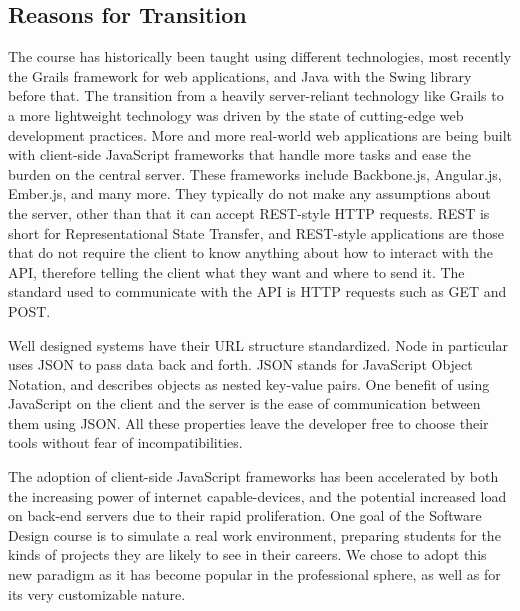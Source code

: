 \documentclass[12pt]{article}
\begin{document}
\subsection{Reasons for Transition}\label{sec:reasons_for_transition}
The course has historically been taught using different technologies, most recently the Grails framework for web applications, and Java with the Swing library before that. 
The transition from a heavily server-reliant technology like Grails to a more lightweight technology was driven by the state of cutting-edge web development practices. 
More and more real-world web applications are being built with client-side JavaScript frameworks that handle more tasks and ease the burden on the central server. 
These frameworks include Backbone.js, Angular.js, Ember.js, and many more. 
They typically do not make any assumptions about the server, other than that it can accept REST-style HTTP requests. 
REST is short for Representational State Transfer, and REST-style applications are those that do not require the client to know anything about how to interact with the API, therefore telling the client what they want and where to send it. 
The standard used to communicate with the API is HTTP requests such as GET and POST.

Well designed systems have their URL structure standardized. 
Node in particular uses JSON to pass data back and forth. 
JSON stands for JavaScript Object Notation, and describes objects as nested key-value pairs. 
One benefit of using JavaScript on the client and the server is the ease of communication between them using JSON. 
All these properties leave the developer free to choose their tools without fear of incompatibilities. 

The adoption of client-side JavaScript frameworks has been accelerated by both the increasing power of internet capable-devices, and the potential increased load on back-end servers due to their rapid proliferation. 
One goal of the Software Design course is to simulate a real work environment, preparing students for the kinds of projects they are likely to see in their careers. 
We chose to adopt this new paradigm as it has become popular in the professional sphere, as well as for its very customizable nature.
\end{document}
